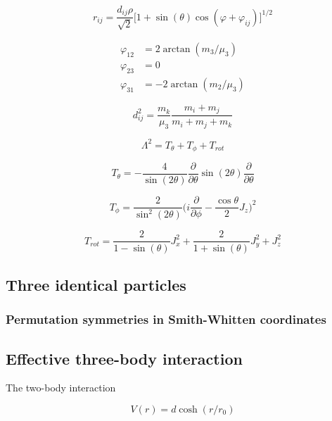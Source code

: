 \documentclass{article}
\begin{document}
\begin{equation}
r_{ij} = \frac{d_{ij} \rho}{\sqrt{2}} \Big[1+\sin(\theta) \cos{(\varphi + \varphi_{ij})}\Big]^{1/2}
\end{equation}

\begin{align*}
\varphi_{12} &= 2 \arctan{(m_{3} / \mu_{3})} \\
\varphi_{23} &= 0 \\
\varphi_{31} &= -2 \arctan{(m_{2} / \mu_{3})}
\end{align*}

\begin{equation}
d_{ij}^{2} =  \frac{m_{k}}{\mu_{3}} \frac{m_{i} + m_{j}}{m_{i} + m_{j} + m_{k}}
\end{equation}

\begin{equation}
\Lambda^2 = T_{\theta} + T_{\phi} + T_{rot}  
\end{equation}

\begin{equation}
T_{\theta} = -\frac{4}{\sin(2\theta)} \frac{\partial}{\partial \theta} \sin(2\theta) \frac{\partial}{\partial \theta}
\end{equation}

\begin{equation}
T_{\phi} = \frac{2}{\sin^2{(2 \theta)}} \Big( i \frac{\partial}{\partial \phi} - \frac{\cos{\theta}}{2} J_{z}\Big)^2  
\end{equation}

\begin{equation}
T_{rot} = \frac{2}{1-\sin(\theta)} J_{x}^{2} + \frac{2}{1+\sin(\theta)} J_{y}^{2} + J_{z}^{2}  
\end{equation}

\subsection{Three identical particles}
\subsubsection{Permutation symmetries in Smith-Whitten coordinates}

\subsection{Effective three-body interaction}
The two-body interaction 

\begin{equation}
V(r) = d\cosh{(r/r_0)}
\end{equation}
\end{document}
